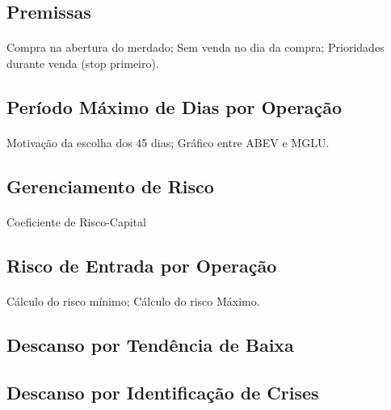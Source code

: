 \subsection{Premissas}
\paragraph{} Compra na abertura do merdado; Sem venda no dia da compra; Prioridades durante venda (stop primeiro).

\subsection{Período Máximo de Dias por Operação}
\paragraph{} Motivação da escolha dos 45 dias; Gráfico entre ABEV e MGLU.

\subsection{Gerenciamento de Risco}
\paragraph{} Coeficiente de Risco-Capital

\subsection{Risco de Entrada por Operação}
\paragraph{} Cálculo do risco mínimo; Cálculo do risco Máximo.

\subsection{Descanso por Tendência de Baixa}
\paragraph{}

\subsection{Descanso por Identificação de Crises}
\paragraph{}

